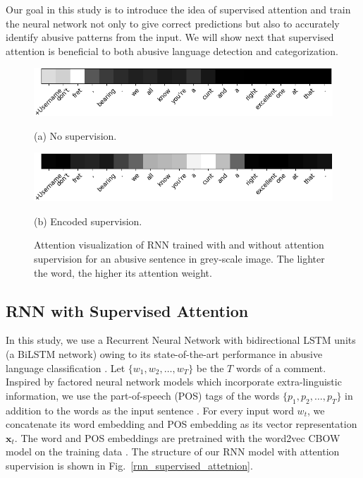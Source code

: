 \documentclass[letterpaper]{article} %
\begin{document}
Our goal in this study is to introduce the idea of supervised attention  and train the neural network not only to give correct predictions but also to accurately identify abusive patterns from the input. We will show next that supervised attention is beneficial to both abusive language detection and categorization.


\begin{figure}[htbp!]
\captionsetup{font=normalsize}
\centering
\begin{minipage}[c]{0.65\textwidth}
\centerline{\includegraphics[width=\linewidth]{long_comm_no_att.png}}
\centerline{\small{(a) No supervision.}}
\end{minipage}
\begin{minipage}{0.65\textwidth}
\centerline{\includegraphics[width=\linewidth]{long_comm_encoded_att.png}}
\centerline{\small{(b) Encoded supervision.}}
\end{minipage}
\caption{Attention visualization of RNN trained with and without attention supervision for an abusive sentence in grey-scale image. The lighter the word, the higher its attention weight.}
\label{fig:att_example}
\end{figure}
\subsection{RNN with Supervised Attention}
In this study, we use a Recurrent Neural Network with bidirectional LSTM units (a BiLSTM network) owing to its state-of-the-art performance in abusive language classification \cite{chakrabarty2019pay}.
Let  $\{w_{1}, w_{2}, \ldots, w_{T}\}$ be the  $T$ words of a comment.
Inspired by factored neural network models which incorporate extra-linguistic information, we use the part-of-speech (POS) tags of the words  $\{p_{1}, p_{2}, \ldots, p_{T}\}$ in addition to the words as the input sentence \cite{sennrich2016linguistic}.
For every input word $w_{t}$, we concatenate its word embedding and POS embedding as its vector representation $\mathbf{x}_{t}$. The word and POS embeddings are pretrained with the word2vec CBOW model on the training data \cite{mikolov2013distributed}.
The structure of our RNN model with attention supervision is shown in Fig.~\ref{rnn_supervised_attetnion}.
\end{document}
